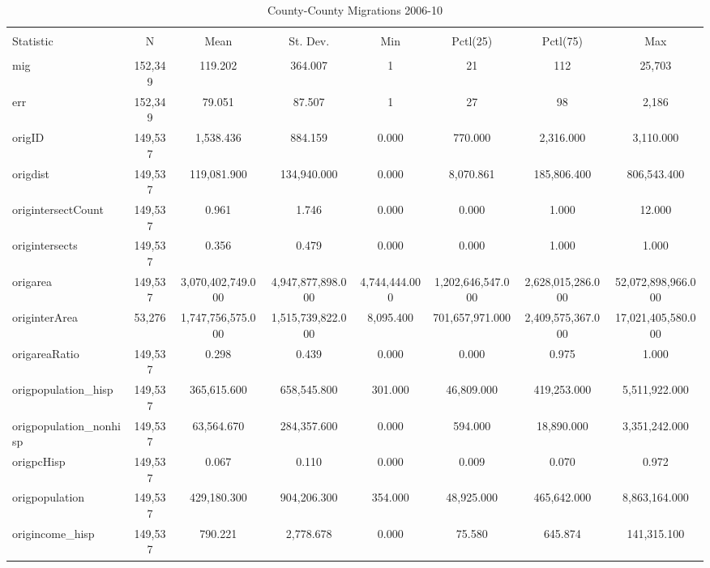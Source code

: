 
\begin{table}[!htbp] \centering 
  \caption{County-County Migrations 2006-10} 
  \label{} 
\scriptsize 
\begin{tabular}{@{\extracolsep{5pt}}lccccccc} 
\\[-1.8ex]\hline 
\hline \\[-1.8ex] 
Statistic & \multicolumn{1}{c}{N} & \multicolumn{1}{c}{Mean} & \multicolumn{1}{c}{St. Dev.} & \multicolumn{1}{c}{Min} & \multicolumn{1}{c}{Pctl(25)} & \multicolumn{1}{c}{Pctl(75)} & \multicolumn{1}{c}{Max} \\ 
\hline \\[-1.8ex] 
mig & 152,349 & 119.202 & 364.007 & 1 & 21 & 112 & 25,703 \\ 
err & 152,349 & 79.051 & 87.507 & 1 & 27 & 98 & 2,186 \\ 
origID & 149,537 & 1,538.436 & 884.159 & 0.000 & 770.000 & 2,316.000 & 3,110.000 \\ 
origdist & 149,537 & 119,081.900 & 134,940.000 & 0.000 & 8,070.861 & 185,806.400 & 806,543.400 \\ 
origintersectCount & 149,537 & 0.961 & 1.746 & 0.000 & 0.000 & 1.000 & 12.000 \\ 
origintersects & 149,537 & 0.356 & 0.479 & 0.000 & 0.000 & 1.000 & 1.000 \\ 
origarea & 149,537 & 3,070,402,749.000 & 4,947,877,898.000 & 4,744,444.000 & 1,202,646,547.000 & 2,628,015,286.000 & 52,072,898,966.000 \\ 
originterArea & 53,276 & 1,747,756,575.000 & 1,515,739,822.000 & 8,095.400 & 701,657,971.000 & 2,409,575,367.000 & 17,021,405,580.000 \\ 
origareaRatio & 149,537 & 0.298 & 0.439 & 0.000 & 0.000 & 0.975 & 1.000 \\ 
origpopulation\_hisp & 149,537 & 365,615.600 & 658,545.800 & 301.000 & 46,809.000 & 419,253.000 & 5,511,922.000 \\ 
origpopulation\_nonhisp & 149,537 & 63,564.670 & 284,357.600 & 0.000 & 594.000 & 18,890.000 & 3,351,242.000 \\ 
origpcHisp & 149,537 & 0.067 & 0.110 & 0.000 & 0.009 & 0.070 & 0.972 \\ 
origpopulation & 149,537 & 429,180.300 & 904,206.300 & 354.000 & 48,925.000 & 465,642.000 & 8,863,164.000 \\ 
origincome\_hisp & 149,537 & 790.221 & 2,778.678 & 0.000 & 75.580 & 645.874 & 141,315.100 \\ 

\end{tabular}
\end{table}
